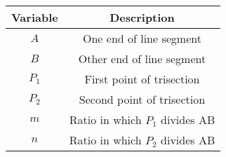 \begin{tabular}[12pt]{ |c| c|}
    \hline
    \textbf{Variable} & \textbf{Description}\\ 
    \hline
    $A$ & One end of line segment \\
    \hline 
    $B$ & Other end of line segment \\
    \hline
    $P_1$ & First point of trisection \\
    \hline
    $P_2$ & Second point of trisection \\
    \hline
    $m$ & Ratio in which $P_1$ divides AB \\
    \hline
    $n$ & Ratio in which $P_2$ divides AB \\
    \hline
    \end{tabular}

